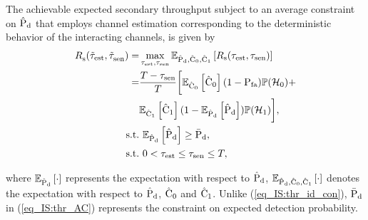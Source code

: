 \begin{theorem} \label{th_IS:th1}
\normalfont
The achievable expected secondary throughput subject to an average constraint on $\epd$ that employs channel estimation corresponding to the deterministic behavior of the interacting channels, is given by  
\begin{align}
\trsac(\ttest, \ttsenac) =& \maxi_{\tc{\test}, \tsen} \e{\epd, \ecz, \eco}{\rs(\test, \tsen)} \nonumber \\ 
\quad =& \frac{T- \tsen}{T} \bigg[ \e{\ecz}{\ecz} (1 - \pfa) \phz + \nonumber \\ \quad & \e{\eco}{\eco} (1 - \e{\epd}{\epd}) \pho  \bigg], \label{eq_IS:thr_AC} \\
\text{s.t.} & \text{ }  \e{\epd}{\epd} \ge \pdd, \label{eq_IS:AC} \\
\tc{\text{s.t.}} & \text{ }  \tc{0 < \test \le \tsen \le T,} \nonumber
\end{align}
\end{theorem} 
where $\e{\epd}{\cdot}$ represents the expectation with respect to $\epd$, $\e{\epd, \ecz, \eco}{\cdot}$ denotes the expectation with respect to $\epd$, $\ecz$ and $\eco$. Unlike (\ref{eq_IS:thr_id_con}), $\pdd$ in (\ref{eq_IS:thr_AC}) represents the constraint on expected detection probability.

\begin{IEEEproof}[Solution]
\end{IEEEproof}

